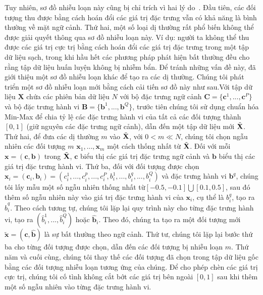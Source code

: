 Tuy nhiên, sơ đồ nhiễu loạn này cũng bị chỉ trích vì hai lý do~\citep{song2007conditional,kuo2018detecting}.
Đầu tiên, các đối tượng thu được bằng cách hoán đổi các giá trị đặc trưng vẫn có khả năng là bình thường về mặt ngữ cảnh. Thứ hai, một số loại dị thường rất phổ biến không thể được giải quyết thông qua sơ đồ nhiễu loạn này. Ví dụ: người ta không thể thu được các giá trị cực trị bằng cách hoán đổi các giá trị đặc trưng trong một tập dữ liệu sạch, trong khi hầu hết các phương pháp phát hiện bất thường đều cho rằng tập dữ liệu huấn luyện không bị nhiễm bẩn. Để tránh những vấn đề này, \cite{kuo2018detecting} đã giới thiệu một sơ đồ nhiễu loạn khác để tạo ra các dị thường. Chúng tôi phát triển một sơ đồ nhiễu loạn mới bằng cách cải tiến sơ đồ này như sau.Với tập dữ liệu $\mathbf{X}$ chứa các phiên bản dữ liệu $N$ với bộ đặc trưng ngữ cảnh $\mathbf{C} = \{\mathbf{c}^{1},...,\mathbf{c}^{P}\}$ và bộ đặc trưng hành vi $\mathbf{B} = \{\mathbf{b}^{1},...,\mathbf{b}^{Q}\}$, trước tiên chúng tôi sử dụng chuẩn hóa Min-Max để chia tỷ lệ các đặc trưng hành vi của tất cả các đối tượng thành $[0,1]$ (giữ nguyên các đặc trưng ngữ cảnh), dẫn đến một tập dữ liệu mới $\Tilde{\mathbf{X}}$. Thứ hai, để đưa các dị thường $m$ vào $\Tilde{\mathbf{X}}$, với $0<m \ll N$, chúng tôi chọn ngẫu nhiên các đối tượng $m$ $\mathbf{x}_{1},\ldots,\mathbf{x}_{m}$ một cách thống nhất từ ​​$\Tilde{\mathbf{X}}$. Đối với mỗi $\mathbf{x} =(\mathbf{c},\mathbf{b})$ trong $\Tilde{\mathbf{X}}$, $\mathbf{c}$ biểu thị các giá trị đặc trưng ngữ cảnh và $\mathbf{b}$ biểu thị các giá trị đặc trưng hành vi. Thứ ba, đối với đối tượng được chọn $\mathbf{x}_{i} = (\mathbf{c}_{i}, \mathbf{b}_{i})= (c^{1}_{i},...,c^{p}_{i},...,c^{P}_{i},b^{1}_{i},...,b^{q}_{i},...,b^{Q}_{i})$ và đặc trưng hành vi $\mathbf{b}^{q}$, chúng tôi lấy mẫu một số ngẫu nhiên thống nhất từ ​​$[-0.5,-0.1] \bigcup [0.1,0.5]$, sau đó thêm số ngẫu nhiên này vào giá trị đặc trưng hành vi của $\mathbf{x}_{i}$, cụ thể là $b^{q}_{i}$, tạo ra $\hat{b}^{q}_{i}$. Theo cách tương tự, chúng tôi lặp lại quy trình này cho từng đặc trưng hành vi, tạo ra $(\hat{b}^{1}_{i},...,\hat{b}^{Q}_{i})$ hoặc $\hat{\mathbf{b}}_{i}$. Theo đó, chúng ta tạo ra một đối tượng mới
$\tilde{\mathbf{x}} = (\mathbf{c}, \hat{\mathbf{b}})$ là sự bất thường theo ngữ cảnh. Thứ tư, chúng tôi lặp lại bước thứ ba cho từng đối tượng được chọn, dẫn đến các đối tượng bị nhiễu loạn $m$.
Thứ năm và cuối cùng, chúng tôi thay thế các đối tượng đã chọn trong tập dữ liệu gốc bằng các đối tượng nhiễu loạn tương ứng của chúng. Để cho phép chèn các giá trị cực trị, chúng tôi cố tình không cắt bớt các giá trị bên ngoài $[0,1]$ sau khi thêm một số ngẫu nhiên vào từng đặc trưng hành vi.

